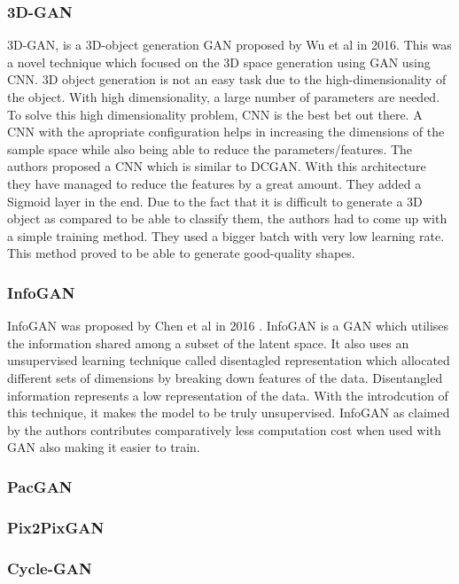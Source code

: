 \documentclass[conference]{IEEEtran}
\begin{document}
\subsubsection{3D-GAN}
3D-GAN, is a 3D-object generation GAN proposed by Wu et al \cite{b8} in 2016. This was a novel technique which focused on the 3D space generation using GAN using CNN. 3D object generation is not an easy task due to the high-dimensionality of the object. With high dimensionality, a large number of parameters are needed. To solve this high dimensionality problem, CNN is the best bet out there. A CNN with the apropriate configuration helps in increasing the dimensions of the sample space while also being able to reduce the parameters/features. The authors proposed a CNN which is similar to DCGAN. With this architecture they have managed to reduce the features by a great amount. They added a Sigmoid layer in the end. Due to the fact that it is difficult to generate a 3D object as compared to be able to classify them, the authors had to come up with a simple training method. They used a bigger batch with very low learning rate. This method proved to be able to generate good-quality shapes.

\subsubsection{InfoGAN}
InfoGAN was proposed by Chen et al in 2016 \cite{b6}. InfoGAN is a GAN which utilises the information shared among a subset of the latent space. It also uses an unsupervised learning technique called disentagled representation which allocated different sets of dimensions by breaking down features of the data. Disentangled information represents a low representation of the data. With the introdcution of this technique, it makes the model to be truly unsupervised. InfoGAN as claimed by the authors contributes comparatively less computation cost when used with GAN also making it easier to train. 

\subsubsection{PacGAN}

\subsubsection{Pix2PixGAN}

\subsubsection{Cycle-GAN}
\end{document}
